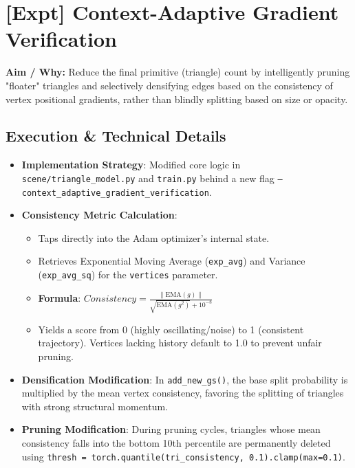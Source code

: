 \section[\textcolor{\statusSecSix}{[Expt] Context-Adaptive Gradient Verification}]{\textcolor{\statusSecSix}{[Expt] Context-Adaptive Gradient Verification}}

\begin{tcolorbox}[title={Status: [Pending Execution]}, colframe=\statusSecSix, colback=\statusSecSix!5]
\textbf{Aim / Why:} Reduce the final primitive (triangle) count by intelligently pruning "floater" triangles and selectively densifying edges based on the consistency of vertex positional gradients, rather than blindly splitting based on size or opacity.
\end{tcolorbox}

\subsection{Execution \& Technical Details}
\begin{itemize}
    \item \textbf{Implementation Strategy}: Modified core logic in \texttt{scene/triangle\_model.py} and \texttt{train.py} behind a new flag \texttt{--context\_adaptive\_gradient\_verification}.
    \item \textbf{Consistency Metric Calculation}:
    \begin{itemize}
        \item Taps directly into the Adam optimizer's internal state.
        \item Retrieves Exponential Moving Average (\texttt{exp\_avg}) and Variance (\texttt{exp\_avg\_sq}) for the \texttt{vertices} parameter.
        \item \textbf{Formula}: $Consistency = \frac{\|\text{EMA}(g)\|}{\sqrt{\text{EMA}(g^2)} + 10^{-8}}$
        \item Yields a score from 0 (highly oscillating/noise) to 1 (consistent trajectory). Vertices lacking history default to 1.0 to prevent unfair pruning.
    \end{itemize}
    \item \textbf{Densification Modification}: In \texttt{add\_new\_gs()}, the base split probability is multiplied by the mean vertex consistency, favoring the splitting of triangles with strong structural momentum.
    \item \textbf{Pruning Modification}: During pruning cycles, triangles whose mean consistency falls into the bottom 10th percentile are permanently deleted using \texttt{thresh = torch.quantile(tri\_consistency, 0.1).clamp(max=0.1)}.
\end{itemize}

